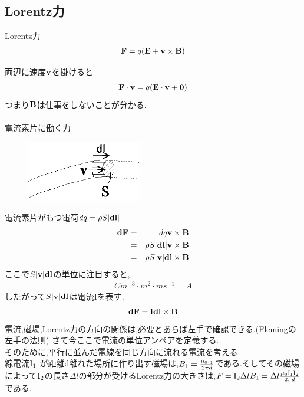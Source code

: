 \documentclass[../main]{subfiles}
\begin{document}
\subsection{Lorentz力}
\begin{itembox}[c]{Lorentz力}
\begin{eqnarray}
{\bf F} = q ({\bf E} + {\bf v} \times {\bf B})
\end{eqnarray}
\end{itembox}
両辺に速度${\bf v}$を掛けると
\begin{eqnarray*}
{\bf F}\cdot{\bf v} = q ( {\bf E}\cdot{\bf v} + {\bf 0} )
\end{eqnarray*}
つまり${\bf B}$は仕事をしないことが分かる. \\
\\
電流素片に働く力 \\
\begin{figure}[htbp]
 \begin{center}
  \includegraphics[width=50mm]{9.6.eps}
 \end{center}
 \caption{}
 \label{fig:six}
\end{figure}
電流素片がもつ電荷$dq=\rho S|{\bf dl}|$ \\
\begin{eqnarray*}
{\bf dF}&=&dq{\bf v} \times {\bf B} \\
&=&\rho S |{\bf dl}| {\bf v} \times {\bf B} \\
&=&\rho S |{\bf v}| {\bf dl}  \times {\bf B}
\end{eqnarray*}
ここで$S |{\bf v}| {\bf dl}$の単位に注目すると, \\
\begin{eqnarray*}
Cm^{-3} \cdot m^2 \cdot ms^{-1} = A
\end{eqnarray*}
したがって$S |{\bf v}| {\bf dl}$は電流{\rm I}を表す.
\begin{eqnarray*}
{\bf dF} ={\rm I} {\bf dl}  \times {\bf B}
\end{eqnarray*}
電流,磁場,Lorentz力の方向の関係は,必要とあらば左手で確認できる.(Flemingの左手の法則)
さて今ここで電流の単位アンペアを定義する. \\
そのために,平行に並んだ電線を同じ方向に流れる電流を考える. \\
線電流${\rm I_1}$ が距離d離れた場所に作り出す磁場は,$B_1=\frac{\mu_0 {\rm I_1}}{2 \pi d}$である.そしてその磁場によって${\rm I_2}$の長さ$\Delta l$の部分が受けるLorentz力の大きさは,$F={\rm I_2} \Delta l B_1=\Delta l \frac{\mu_0 {\rm I_1}{\rm I_2}}{2 \pi d}$である. \\
\end{document}

